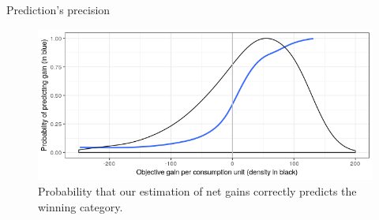 \documentclass[aspectratio=169,9pt,dvipsnames]{beamer}
\begin{document}
    \begin{frame}{Prediction's precision} \label{prediction_precision}

\begin{figure}
\includegraphics[width=\columnwidth]{Images/proba_correct_prediction.png}
\caption{Probability that our estimation of net gains correctly predicts the winning category.}
\end{figure}


    \end{frame}
\end{document}
